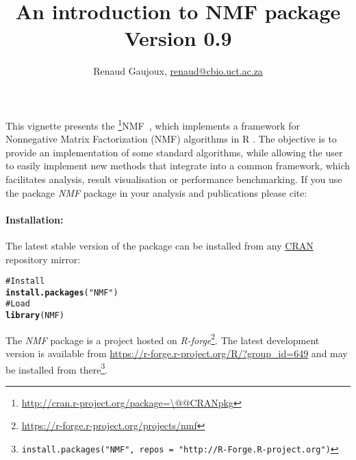 \documentclass[a4paper]{article}\usepackage{graphicx, color}
\makeatletter
\newcommand{\hlfunctioncall}[1]{\textcolor[rgb]{0.501960784313725,0,0.329411764705882}{\textbf{#1}}}%
\newcommand{\hlstring}[1]{\textcolor[rgb]{0.6,0.6,1}{#1}}%
\newcommand{\hlcomment}[1]{\textcolor[rgb]{0.180392156862745,0.6,0.341176470588235}{#1}}%
\newenvironment{kframe}{%
 \def\at@end@of@kframe{}%
 \ifinner\ifhmode%
  \def\at@end@of@kframe{\end{minipage}}%
  \begin{minipage}{\columnwidth}%
 \fi\fi%
 \def\FrameCommand##1{\hskip\@totalleftmargin \hskip-\fboxsep
 \colorbox{shadecolor}{##1}\hskip-\fboxsep
     \hskip-\linewidth \hskip-\@totalleftmargin \hskip\columnwidth}%
 \MakeFramed {\advance\hsize-\width
   \@totalleftmargin\z@ \linewidth\hsize
   \@setminipage}}%
 {\par\unskip\endMakeFramed%
 \at@end@of@kframe}
\newenvironment{knitrout}{}{} %
\let\code=\texttt
\newcommand{\pkgname}[1]{\textit{#1}\xspace}
\newcommand{\Rpkg}[1]{\pkgname{#1} package\xspace}
\newcommand{\CRANurl}[1]{\url{http://cran.r-project.org/package=#1}}
\def\CRANpkg{\@ifstar\@CRANpkg\@@CRANpkg}
\def\@CRANpkg#1{\href{http://cran.r-project.org/package=#1}{\pkgname{#1}}\footnote{\CRANurl{#1}}}
\def\@@CRANpkg#1{\href{http://cran.r-project.org/package=#1}{\pkgname{#1}} package\footnote{\CRANurl{#1}}}
\newcommand{\citeCRANpkg}[1]{\CRANpkg{#1}~\cite{#1}}
\newcommand{\nmfpack}{\Rpkg{NMF}}
\renewcommand{\cite}[1]{\parencite{#1}}
\makeatother
\begin{document}




\title{An introduction to NMF package\\\small Version
0.9}
\author{Renaud Gaujoux, \url{renaud@cbio.uct.ac.za}}

\maketitle

This vignette presents the \citeCRANpkg{NMF}, which implements a framework
for Nonnegative Matrix Factorization (NMF) algorithms in R \cite{R}.
The objective is to provide an implementation of some standard algorithms, while
allowing the user to easily implement new methods that integrate into a
common framework, which facilitates analysis, result visualisation or
performance benchmarking.
If you use the package \nmfpack in your analysis and publications please cite:

\bigskip
{}

\bigskip
\paragraph{Installation:} The latest stable version of the package can be installed from any
\href{http://cran.r-project.org}{CRAN} repository mirror:
\begin{knitrout}
\color{fgcolor}\begin{kframe}
\begin{alltt}
\hlcomment{# Install}
\hlfunctioncall{install.packages}(\hlstring{"NMF"})
\hlcomment{# Load}
\hlfunctioncall{library}(NMF)
\end{alltt}
\end{kframe}
\end{knitrout}

The \nmfpack is a project hosted on \emph{R-forge}\footnote{\url{https://r-forge.r-project.org/projects/nmf}}.
The latest development version is available from \url{https://r-forge.r-project.org/R/?group_id=649} and may be installed from there\footnote{\code{install.packages("NMF", repos = "http://R-Forge.R-project.org")}}.
\end{document}
